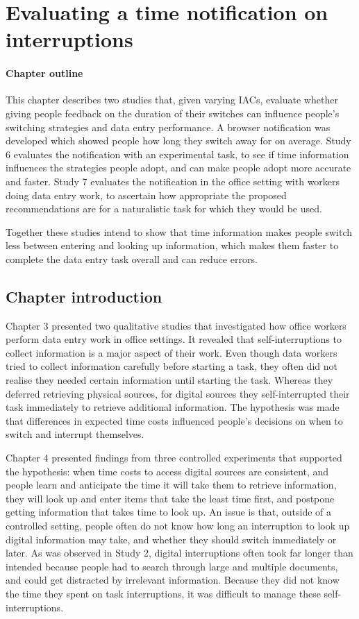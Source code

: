 \chapter{Evaluating a time notification on interruptions}

\begin{mynote}
\subsubsection{Chapter outline}
This chapter describes two studies that, given varying IACs, evaluate whether giving people feedback on the duration of their switches can influence people's switching strategies and data entry performance. A browser notification was developed which showed people how long they switch away for on average. Study 6 evaluates the notification with an experimental task, to see if time information influences the strategies people adopt, and can make people adopt more accurate and faster. Study 7 evaluates the notification in the office setting with workers doing data entry work, to ascertain how appropriate the proposed recommendations are for a naturalistic task for which they would be used.

Together these studies intend to show that time information makes people switch less between entering and looking up information, which makes them faster to complete the data entry task overall and can reduce errors.
\end{mynote}

\section{Chapter introduction}
Chapter 3 presented two qualitative studies that investigated how office workers perform data entry work in office settings. It revealed that self-interruptions to collect information is a major aspect of their work. Even though data workers tried to collect information carefully before starting a task, they often did not realise they needed certain information until starting the task. Whereas they deferred retrieving physical sources, for digital sources they self-interrupted their task immediately to retrieve additional information. The hypothesis was made that differences in expected time costs influenced people's decisions on when to switch and interrupt themselves.

Chapter 4 presented findings from three controlled experiments that supported the hypothesis: when time costs to access digital sources are consistent, and people learn and anticipate the time it will take them to retrieve information, they will look up and enter items that take the least time first, and postpone getting information that takes time to look up. An issue is that, outside of a controlled setting, people often do not know how long an interruption to look up digital information may take, and whether they should switch immediately or later. As was observed in Study 2, digital interruptions often took far longer than intended because people had to search through large and multiple documents, and could get distracted by irrelevant information. Because they did not know the time they spent on task interruptions, it was difficult to manage these self-interruptions. 

